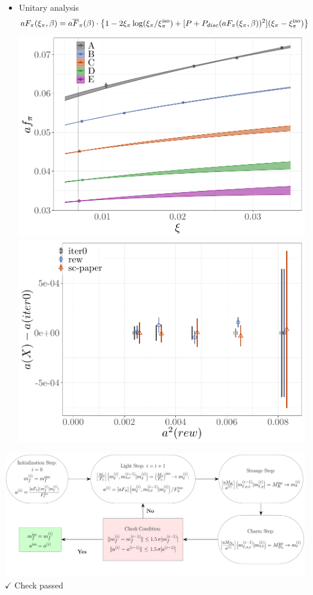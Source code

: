 \documentclass[xcolor={dvipsnames,table}]{beamer}
\begin{document}
\begin{frame}
  \begin{itemize}
    \item Unitary analysis
          \begin{align*}
            aF_{\pi}(\xi_{\pi}, \beta) & =  a\overline{F}_{\pi}(\beta) \cdot \left\{1-2\xi_{\pi}\log(\xi_{\pi}/\xi_{\pi}^{\rm iso})+ [P+P_{disc} (aF_\pi(\xi_{\pi},\beta))^2] (\xi_{\pi}-\xi^{\rm iso}_{\pi})\right\}
          \end{align*}
          \includegraphics[scale=0.5]{plots/fpi_rew}
          \includegraphics[scale=0.5]{plots/scaling_a}
  \end{itemize}
\end{frame}

\begin{frame}
  \includegraphics[scale=0.35]{lat_algo.pdf} \\
  {\huge{\color{green!40}$\checkmark$}} Check passed
\end{frame}
\end{document}

